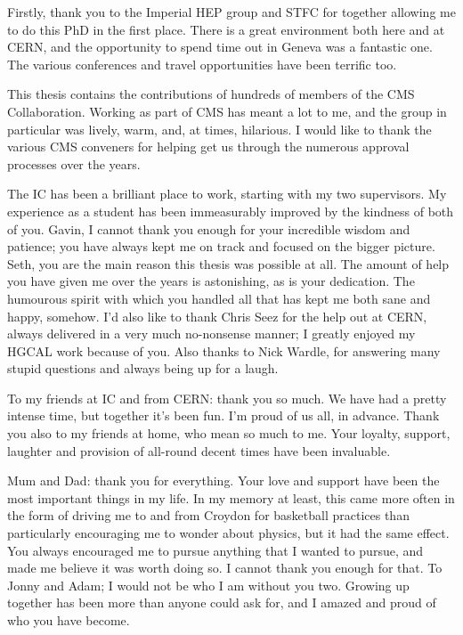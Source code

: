 Firstly, thank you to the Imperial HEP group and STFC for together 
allowing me to do this PhD in the first place. 
There is a great environment both here and at CERN, 
and the opportunity to spend time out in Geneva was a fantastic one.
The various conferences and travel opportunities have been terrific too.

This thesis contains the contributions of hundreds of members of the CMS Collaboration.
Working as part of CMS has meant a lot to me, 
and the \Hgg group in particular was lively, warm, and, at times, hilarious. 
I would like to thank the various CMS \Hgg conveners for helping get us through 
the numerous approval processes over the years.

The IC \Hgg has been a brilliant place to work, starting with my two supervisors. 
My experience as a student has been immeasurably improved by the kindness of both of you.
Gavin, I cannot thank you enough for your incredible wisdom and patience; 
you have always kept me on track and focused on the bigger picture.
Seth, you are the main reason this thesis was possible at all. 
The amount of help you have given me over the years is astonishing, 
as is your dedication. 
The humourous spirit with which you handled all that has kept me both sane and happy, somehow.
I'd also like to thank Chris Seez for the help out at CERN, 
always delivered in a very much no-nonsense manner; I greatly enjoyed my HGCAL work because of you.
Also thanks to Nick Wardle, for answering many stupid questions and always being up for a laugh.

To my friends at IC and from CERN: thank you so much. 
We have had a pretty intense time, but together it's been fun.
I'm proud of us all, in advance.
Thank you also to my friends at home, who mean so much to me.
Your loyalty, support, laughter and provision of all-round decent times have been invaluable.

Mum and Dad: thank you for everything. 
Your love and support have been the most important things in my life.
In my memory at least, this came more often in the form of driving me to and from Croydon 
for basketball practices than particularly encouraging me to wonder about physics, 
but it had the same effect.
You always encouraged me to pursue anything that I wanted to pursue, 
and made me believe it was worth doing so.
I cannot thank you enough for that.
To Jonny and Adam; I would not be who I am without you two.
Growing up together has been more than anyone could ask for, 
and I amazed and proud of who you have become.

